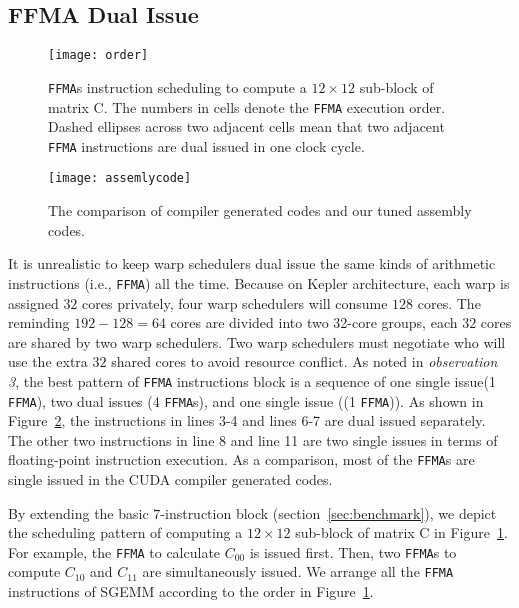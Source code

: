 \subsection{FFMA Dual Issue}
\label{sec:ffma-dual}

\begin{figure}[htbp]
\begin{center}
\texttt{[image: order]}
\caption{{\tt FFMA}s instruction scheduling to compute a $12\times 12$ sub-block of matrix C.  The numbers in
cells denote the {\tt FFMA} execution order. Dashed ellipses across two adjacent cells mean that two adjacent {\tt FFMA} instructions are dual issued in one clock cycle.}
\label{fig:order}
\end{center}
\end{figure}

\begin{figure}[htbp]
\begin{center}
\texttt{[image: assemlycode]}
    \caption{The comparison of compiler generated codes and our tuned assembly codes.}
\label{fig:assemblycode}
\end{center}
\end{figure}

It is unrealistic to keep warp schedulers dual issue the same kinds of arithmetic instructions (i.e., {\tt FFMA}) all
the time. Because on Kepler architecture, each warp is assigned $32$ cores privately, four warp schedulers will consume
$128$ cores. The reminding $192-128=64$ cores are divided into two 32-core groups, each $32$ cores
are shared by two warp schedulers. Two warp schedulers must negotiate who will use the extra $32$ shared cores to avoid
resource conflict.
As noted in {\em observation 3}, the best pattern of {\tt FFMA} instructions block is a sequence of one single issue(1
{\tt FFMA}), two dual issues (4 {\tt FFMA}s), and one single issue ((1 {\tt FFMA})). As shown in
Figure~\ref{fig:assemblycode}, the instructions in lines 3-4 and lines 6-7 are dual issued separately.
The other two instructions in line 8 and line 11 are two single issues in terms of floating-point instruction
execution.
As a comparison, most of the {\tt FFMA}s are single issued in the CUDA compiler generated codes.

By extending the basic $7$-instruction block (section~\ref{sec:benchmark}), we depict the scheduling pattern of computing a $12\times 12$ sub-block of matrix C in Figure~\ref{fig:order}.
For example, the {\tt FFMA} to calculate $C_{00}$ is issued first.
Then, two {\tt FFMA}s to
compute $C_{10}$ and $C_{11}$ are simultaneously issued. We arrange all the {\tt FFMA} instructions of SGEMM according to the order in Figure~\ref{fig:order}.

